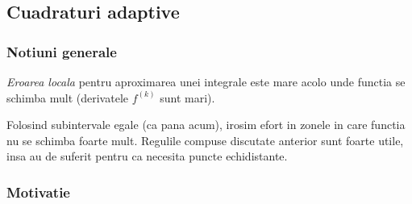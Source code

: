 \documentclass{article}
\begin{document}
\subsection{Cuadraturi adaptive}
\label{sec:adaptive}


\subsubsection{Notiuni generale}
\tab \textit{Eroarea locala} pentru aproximarea unei integrale este mare acolo unde functia se schimba mult (derivatele $f^{(k)}$ sunt mari).

Folosind subintervale egale (ca pana acum), irosim efort in zonele in care functia nu se schimba foarte mult. Regulile compuse discutate anterior sunt foarte utile, insa au de suferit pentru ca necesita puncte echidistante.


\subsubsection{Motivatie}
\end{document}
